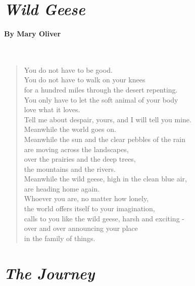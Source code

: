 \newpage
\section*{\emph{Wild Geese}}
\paragraph{By Mary Oliver}~
\begin{verse}
	You do not have to be good.\\
	You do not have to walk on your knees\\
	for a hundred miles through the desert repenting.\\
	You only have to let the soft animal of your body\\
	love what it loves.\\
	Tell me about despair, yours, and I will tell you mine.\\
	Meanwhile the world goes on.\\
	Meanwhile the sun and the clear pebbles of the rain\\
	are moving across the landscapes,\\
	over the prairies and the deep trees,\\
	the mountains and the rivers.\\
	Meanwhile the wild geese, high in the clean blue air,\\
	are heading home again.\\
	Whoever you are, no matter how lonely,\\
	the world offers itself to your imagination,\\
	calls to you like the wild geese, harsh and exciting -\\
	over and over announcing your place\\
	in the family of things.
\end{verse}

\newpage
\section*{\emph{The Journey}}
